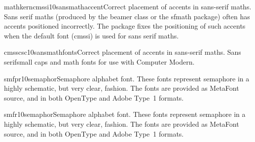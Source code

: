 \documentclass{ddltxtyp}
\begin{document}
\begin{package}{mathkerncmssi10}{sansmathaccent}{Correct placement of accents in sans-serif maths.}
Sans serif maths (produced by the beamer class or the sfmath
package) often has accents positioned incorrectly. The package
fixes the positioning of such accents when the default font
(cmssi) is used for sans serif maths.
\end{package}

\begin{package}{cmsscsc10}{sansmathfonts}{Correct placement of accents in sans-serif maths.}
Sans serifsmall caps and math fonts for use with Computer
Modern.
\end{package}

\begin{package}{smfpr10}{semaphor}{Semaphore alphabet font.}
These fonts represent semaphore in a highly schematic, but very
clear, fashion. The fonts are provided as MetaFont source, and
in both OpenType and Adobe Type~1 formats.
\end{package}
\begin{package}{smfr10}{semaphor}{Semaphore alphabet font.}
These fonts represent semaphore in a highly schematic, but very
clear, fashion. The fonts are provided as MetaFont source, and
in both OpenType and Adobe Type~1 formats.
\end{package}
\end{document}

